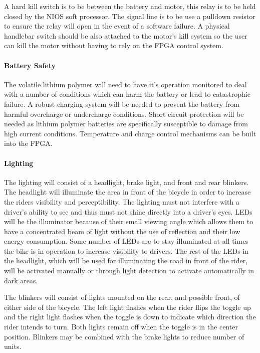\documentclass[12pt,article]{IEEEtran}
\begin{document}
            A hard kill switch is to be between the battery and motor, this relay is to be held closed by the NIOS 
            soft processor. The signal line is to be use a pulldown resistor to ensure the relay will open in the 
            event of a software failure. A physical handlebar switch should be also attached to the motor’s kill 
            system so the user can kill the motor without having to rely on the FPGA control system.
        
        \paragraph{\bfseries Battery Safety}
            The volatile lithium polymer will need to have it's operation monitored to deal with a
            number of conditions which can harm the battery or lead to catastrophic failure. A robust
            charging system will be needed to prevent the battery from harmful overcharge or undercharge
            conditions. Short circuit protection will be needed as lithium polymer batteries are specifically
            susceptible to damage from high current conditions. Temperature and charge control mechanisms
            can be built into the FPGA. 

        \paragraph{\bfseries Lighting}
            The lighting will consist of a headlight, brake light, and front and rear blinkers. The 
            headlight will illuminate the area in front of the bicycle in order to increase the riders 
            visibility and perceptibility.  The lighting must not interfere with a driver’s ability to 
            see and thus must not shine directly into a driver’s eyes.  LEDs will be the illuminator 
            because of their small viewing angle which allows them to have a concentrated beam of light 
            without the use of reflection and their low energy consumption.  Some number of LEDs are to
            stay illuminated at all times the bike is in operation to increase visibility to drivers.  
            The rest of the LEDs in the headlight, which will be used for  illuminating the road in 
            front of the rider, will be activated manually or through light detection to activate 
            automatically in dark areas.
        
            The blinkers will consist of lights mounted on the rear, and possible front, of either side of 
            the bicycle.  The left light flashes when the rider flips the toggle up and the right light 
            flashes when the toggle is down to indicate which direction the rider intends to turn.  Both 
            lights remain off when the toggle is in the center position.  Blinkers may be combined with the 
            brake lights to reduce number of  units.
            
\end{document}
